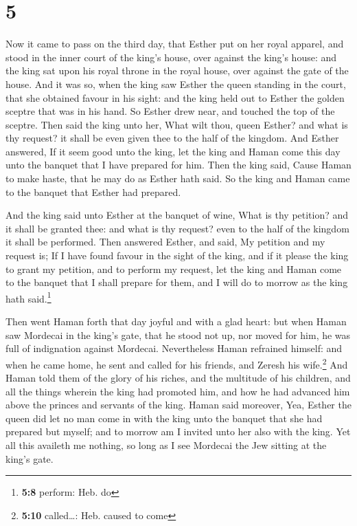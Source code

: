 \hypertarget{section-4}{%
\section{5}\label{section-4}}

 Now it came to pass on the third day, that Esther put on
her royal apparel, and stood in the inner court of the king's house,
over against the king's house: and the king sat upon his royal throne in
the royal house, over against the gate of the house.  And
it was so, when the king saw Esther the queen standing in the court,
that she obtained favour in his sight: and the king held out to Esther
the golden sceptre that was in his hand. So Esther drew near, and
touched the top of the sceptre.  Then said the king unto
her, What wilt thou, queen Esther? and what is thy request? it shall be
even given thee to the half of the kingdom.  And Esther
answered, If it seem good unto the king, let the king and Haman come
this day unto the banquet that I have prepared for him. 
Then the king said, Cause Haman to make haste, that he may do as Esther
hath said. So the king and Haman came to the banquet that Esther had
prepared.

 And the king said unto Esther at the banquet of wine,
What is thy petition? and it shall be granted thee: and what is thy
request? even to the half of the kingdom it shall be performed.
 Then answered Esther, and said, My petition and my
request is;  If I have found favour in the sight of the
king, and if it please the king to grant my petition, and to perform my
request, let the king and Haman come to the banquet that I shall prepare
for them, and I will do to morrow as the king hath said.\footnote{\textbf{5:8}
  perform: Heb. do}

 Then went Haman forth that day joyful and with a glad
heart: but when Haman saw Mordecai in the king's gate, that he stood not
up, nor moved for him, he was full of indignation against Mordecai.
 Nevertheless Haman refrained himself: and when he came
home, he sent and called for his friends, and Zeresh his
wife.\footnote{\textbf{5:10} called\ldots: Heb. caused to come}
 And Haman told them of the glory of his riches, and the
multitude of his children, and all the things wherein the king had
promoted him, and how he had advanced him above the princes and servants
of the king.  Haman said moreover, Yea, Esther the queen
did let no man come in with the king unto the banquet that she had
prepared but myself; and to morrow am I invited unto her also with the
king.  Yet all this availeth me nothing, so long as I see
Mordecai the Jew sitting at the king's gate.

